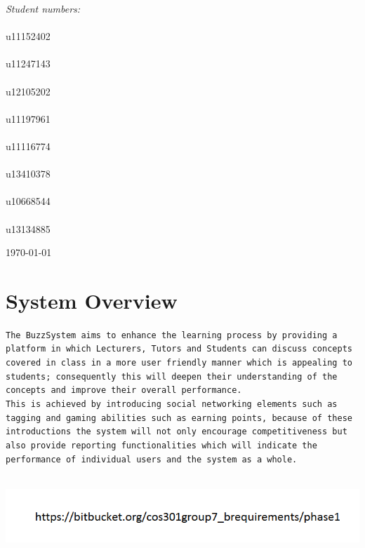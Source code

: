 \documentclass[a4paper,12pt]{report}
\begin{document}
\begin{titlepage}
\begin{center}
\begin{minipage}{0.4\textwidth}
\begin{flushright}
\emph{Student numbers:} \\
\emph{}\\
u11152402
\emph{}\\
\emph{}\\
u11247143
\emph{}\\
\emph{}\\
u12105202
\emph{}\\
\emph{}\\
u11197961
\emph{}\\
\emph{}\\
u11116774
\emph{}\\
\emph{}\\
u13410378
\emph{}\\
\emph{}\\
u10668544
\emph{}\\
\emph{}\\
u13134885


\end{flushright}
\end{minipage}
\vfill


{\large \today}
\end{center}
\end{titlepage}
\setcounter{chapter}{1}
\renewcommand{\thesection}{\arabic{section}}


\section{System Overview}
\texttt{The BuzzSystem aims to enhance the learning process by providing a platform in which Lecturers, Tutors and Students can discuss concepts covered in class in a more user friendly manner which is appealing to students; consequently this will deepen their understanding of the concepts and improve their overall performance. 
\emph{}\\
This is achieved by introducing social networking elements such as tagging and gaming abilities such as earning points, because of these introductions  the system will not only encourage competitiveness but also provide reporting functionalities which will indicate the performance of individual users and the system as a whole.}

\emph{}\\
\includegraphics[width=1\textwidth]{./Url.png}\\[0.4cm]
\end{document}
